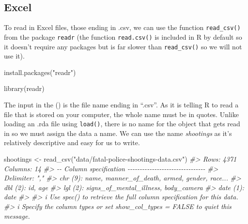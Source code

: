\documentclass[
]{krantz}
\makeatletter
\newenvironment{Shaded}{\begin{snugshade}}{\end{snugshade}}
\newcommand{\CommentTok}[1]{\textcolor[rgb]{0.37,0.37,0.37}{\textit{#1}}}
\newcommand{\FunctionTok}[1]{\textcolor[rgb]{0,0,0}{#1}}
\newcommand{\NormalTok}[1]{#1}
\newcommand{\OtherTok}[1]{\textcolor[rgb]{0.37,0.37,0.37}{#1}}
\newcommand{\StringTok}[1]{\textcolor[rgb]{0.5,0.5,0.5}{#1}}
\newenvironment{kframe}{%
\medskip{}
\setlength{\fboxsep}{.8em}
 \def\at@end@of@kframe{}%
 \ifinner\ifhmode%
  \def\at@end@of@kframe{\end{minipage}}%
  \begin{minipage}{\columnwidth}%
 \fi\fi%
 \def\FrameCommand##1{\hskip\@totalleftmargin \hskip-\fboxsep
 \colorbox{shadecolor}{##1}\hskip-\fboxsep
     \hskip-\linewidth \hskip-\@totalleftmargin \hskip\columnwidth}%
 \MakeFramed {\advance\hsize-\width
   \@totalleftmargin\z@ \linewidth\hsize
   \@setminipage}}%
 {\par\unskip\endMakeFramed%
 \at@end@of@kframe}
\renewenvironment{Shaded}{\begin{kframe}}{\end{kframe}}
\makeatother
\begin{document}
\hypertarget{excel}{%
\subsection{Excel}\label{excel}}

To read in Excel files, those ending in .csv, we can use the function \texttt{read\_csv()} from the package \texttt{readr} (the function \texttt{read.csv()} is included in R by default so it doesn't require any packages but is far slower than \texttt{read\_csv()} so we will not use it).

\begin{Shaded}
\begin{Highlighting}[]
\FunctionTok{install.packages}\NormalTok{(}\StringTok{"readr"}\NormalTok{)}
\end{Highlighting}
\end{Shaded}

\begin{Shaded}
\begin{Highlighting}[]
\FunctionTok{library}\NormalTok{(readr)}
\end{Highlighting}
\end{Shaded}

The input in the () is the file name ending in ``.csv''. As it is telling R to read a file that is stored on your computer, the whole name must be in quotes. Unlike loading an .rda file using \texttt{load()}, there is no name for the object that gets read in so we must assign the data a name. We can use the name \emph{shootings} as it's relatively descriptive and easy for us to write.

\begin{Shaded}
\begin{Highlighting}[]
\NormalTok{shootings }\OtherTok{\textless{}{-}} \FunctionTok{read\_csv}\NormalTok{(}\StringTok{"data/fatal{-}police{-}shootings{-}data.csv"}\NormalTok{)}
\CommentTok{\#\textgreater{} Rows: 4371 Columns: 14}
\CommentTok{\#\textgreater{} {-}{-} Column specification {-}{-}{-}{-}{-}{-}{-}{-}{-}{-}{-}{-}{-}{-}{-}{-}{-}{-}{-}{-}{-}{-}{-}{-}{-}{-}{-}{-}{-}{-}{-}{-}}
\CommentTok{\#\textgreater{} Delimiter: ","}
\CommentTok{\#\textgreater{} chr  (9): name, manner\_of\_death, armed, gender, race...}
\CommentTok{\#\textgreater{} dbl  (2): id, age}
\CommentTok{\#\textgreater{} lgl  (2): signs\_of\_mental\_illness, body\_camera}
\CommentTok{\#\textgreater{} date (1): date}
\CommentTok{\#\textgreater{} }
\CommentTok{\#\textgreater{} i Use \textasciigrave{}spec()\textasciigrave{} to retrieve the full column specification for this data.}
\CommentTok{\#\textgreater{} i Specify the column types or set \textasciigrave{}show\_col\_types = FALSE\textasciigrave{} to quiet this message.}
\end{Highlighting}
\end{Shaded}
\end{document}
